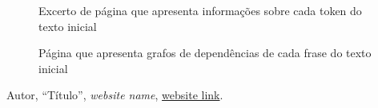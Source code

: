 \documentclass[12pt]{article}
\begin{document}
\begin{figure}[!ht]
	\centering
	\setlength{\abovecaptionskip}{-.4cm}
	\caption{Excerto de página que apresenta informações sobre cada token do texto inicial}
\end{figure}

\begin{figure}[!ht]
	\centering
	\setlength{\abovecaptionskip}{-.4cm}
	\caption{Página que apresenta grafos de dependências de cada frase do texto inicial}
\end{figure}


\clearpage

\begin{thebibliography}{99}
	
	Autor,
	``Título'',
	\textit{website name},
	\url{website link}.
	
\end{thebibliography}
\end{document}
